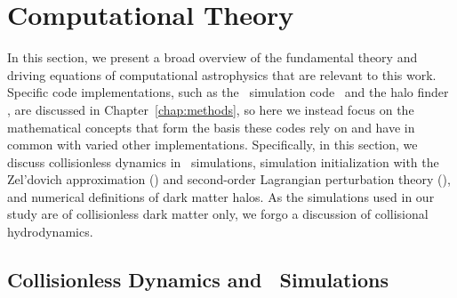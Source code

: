 
%
%

\section{Computational Theory}
\label{sec:computational_theory}



In this section, we present a broad overview of the fundamental theory and driving equations of computational astrophysics that are relevant to this work.  Specific code implementations, such as the \nbody\ simulation code \gadgettwo\ and the halo finder \rockstar, are discussed in Chapter~\ref{chap:methods}, so here we instead focus on the mathematical concepts that form the basis these codes rely on and have in common with varied other implementations.  Specifically, in this section, we discuss collisionless dynamics in \nbody\ simulations, simulation initialization with the Zel'dovich approximation (\za) and second-order Lagrangian perturbation theory (\lpt), and numerical definitions of dark matter halos.  As the simulations used in our study are of collisionless dark matter only, we forgo a discussion of collisional hydrodynamics.




\subsection{Collisionless Dynamics and \nbody\ Simulations}
\label{subsec:computational_theory--nbody_simulations}


